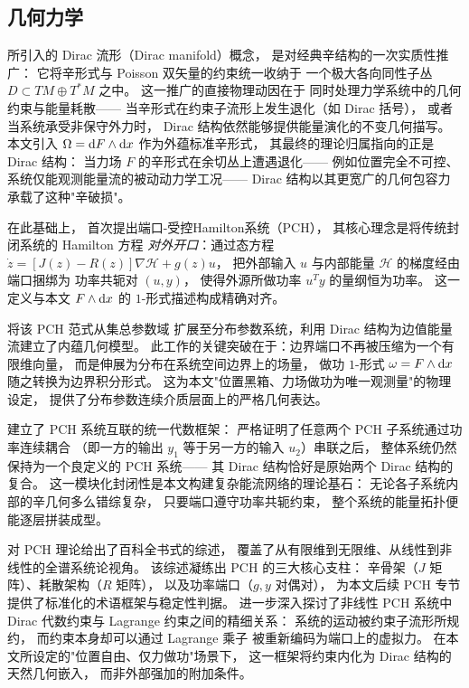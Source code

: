 ﻿\documentclass[10pt,a4paper]{article}
\numberwithin{equation}{section}
\begin{document}
\subsection{几何力学}

\textcite{Courant1990} 所引入的 Dirac 流形（Dirac manifold）概念，
是对经典辛结构的一次实质性推广：
它将辛形式与 Poisson 双矢量的约束统一收纳于
一个极大各向同性子丛 $D \subset TM \oplus T^*M$ 之中。
这一推广的直接物理动因在于
同时处理力学系统中的几何约束与能量耗散——
当辛形式在约束子流形上发生退化（如 Dirac 括号），
或者当系统承受非保守外力时，
Dirac 结构依然能够提供能量演化的不变几何描写。
本文引入 $\Omega = \text dF \wedge \text dx$ 作为外蕴标准辛形式，
其最终的理论归属指向的正是 Dirac 结构：
当力场 $F$ 的辛形式在余切丛上遭遇退化——
例如位置完全不可控、系统仅能观测能量流的被动动力学工况——
Dirac 结构以其更宽广的几何包容力承载了这种"辛破损"。

在此基础上，\textcite{MaschkeVanDerSchaft1992} 首次提出端口-受控Hamilton系统（PCH），
其核心理念是将传统封闭系统的 Hamilton 方程
\emph{对外开口}：通过态方程
$\dot{z} = [J(z)-R(z)]\nabla\mathcal H + g(z)u$，
把外部输入 $u$ 与内部能量 $\mathcal H$ 的梯度经由端口捆绑为
功率共轭对 $(u,y)$，
使得外源所做功率 $u^T y$ 的量纲恒为功率。
这一定义与本文 $F \wedge \text dx$ 的 $1$-形式描述构成精确对齐。

\textcite{VanDerSchaftMaschke2002} 将该 PCH 范式从集总参数域
扩展至分布参数系统，利用 Dirac 结构为边值能量流建立了内蕴几何模型。
此工作的关键突破在于：边界端口不再被压缩为一个有限维向量，
而是伸展为分布在系统空间边界上的场量，
做功 $1$-形式 $\omega = F \wedge \text dx$ 随之转换为边界积分形式。
这为本文"位置黑箱、力场做功为唯一观测量"的物理设定，
提供了分布参数连续介质层面上的严格几何表达。

\textcite{CerveraVanDerSchaftBanos2007} 建立了 PCH 系统互联的统一代数框架：
严格证明了任意两个 PCH 子系统通过功率连续耦合
（即一方的输出 $y_1$ 等于另一方的输入 $u_2$）串联之后，
整体系统仍然保持为一个良定义的 PCH 系统——
其 Dirac 结构恰好是原始两个 Dirac 结构的复合。
这一模块化封闭性是本文构建复杂能流网络的理论基石：
无论各子系统内部的辛几何多么错综复杂，
只要端口遵守功率共轭约束，
整个系统的能量拓扑便能逐层拼装成型。

\textcite{VanDerSchaftJeltsema2014} 对 PCH 理论给出了百科全书式的综述，
覆盖了从有限维到无限维、从线性到非线性的全谱系统论视角。
该综述凝练出 PCH 的三大核心支柱：
辛骨架（$J$ 矩阵）、耗散架构（$R$ 矩阵），
以及功率端口（$g, y$ 对偶对），
为本文后续 PCH 专节提供了标准化的术语框架与稳定性判据。
\textcite{VanDerSchaftMaschke2020} 进一步深入探讨了非线性 PCH 系统中
Dirac 代数约束与 Lagrange 约束之间的精细关系：
系统的运动被约束子流形所规约，
而约束本身却可以通过 Lagrange 乘子
被重新编码为端口上的虚拟力。
在本文所设定的"位置自由、仅力做功"场景下，
这一框架将约束内化为 Dirac 结构的天然几何嵌入，
而非外部强加的附加条件。
\end{document}

